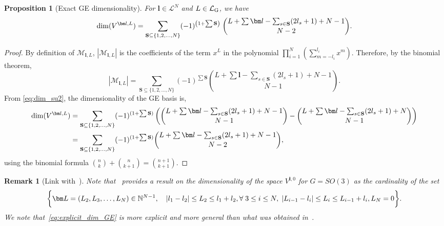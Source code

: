 \documentclass{article}
\newcommand{\card}[1]{|{#1}|}
\newcommand{\dimge}[2]{\dim(V^{#1,#2})}
\newtheorem{proposition}[theorem]{Proposition}
\newtheorem{remark}[theorem]{Remark}
\numberwithin{equation}{section}
\def\N{\mathbb{N}}
\def\bl{{\bm l}}
\def\bL{{\bm L}}
\def\calM{\mathcal{M}}
\def\calL{\mathcal{L}}
\def\calLG{\mathcal{\calL_{\rm G}}}
\def\dim{{{\rm dim}}}
\begin{document}
\begin{proposition}[Exact GE dimensionality]
    For $\bl\in\calL^N$ and $L\in\calLG$, we have
    \begin{equation}\label{eq:explicit_dim_GE}
        \dimge{\bl}{L}=\sum_{{\mathbf S}\subseteq \{1,2,\ldots,N\}}
        (-1)^{\left( 1+\sum {\mathbf S} \right)} 
        \;\binom{L+\sum\bl-\sum_{s\in{\mathbf S}}(2l_s+1)+N-1 }{N-2}.
    \end{equation}
\end{proposition}
\begin{proof} By definition of $\calM_{\bl,L}$, $\card{\calM_{\bl,L}}$ is the coefficients of the term $x^L$ in the polynomial
$
    \prod_{i=1}^N \left(\sum_{m=-l_i}^{l_i} x^m \right).
$
Therefore, by the binomial theorem,
\begin{equation*}
    \card{\calM_{\bl,L}}=\sum_{{\mathbf S}\subseteq \{1,2,\ldots,N\}}(-1)^{\sum {\mathbf S}} \binom{L+\sum\bl-\sum_{s\in{\mathbf S}}(2l_s+1)+N-1}{ N-1}.
\end{equation*}
From \eqref{eq:dim_su2}, the dimensionality of the GE basis is,
\begin{align*}
    \dimge{\bl}{L}&=\sum_{{\mathbf S}\subseteq \{1,2,\ldots,N\}}(-1)^{(1+\sum {\mathbf S})} \left(\binom{L+\sum\bl-\sum_{s\in{\mathbf S}}(2l_s+1)+N-1 }{ N-1}-\binom{L+\sum\bl-\sum_{s\in{\mathbf S}}(2l_s+1)+N }{ N-1}\right)\\
    &=\sum_{{\mathbf S}\subseteq \{1,2,\ldots,N\}}(-1)^{(1+\sum {\mathbf S})} \binom{L+\sum\bl-\sum_{s\in{\mathbf S}}(2l_s+1)+N-1 }{ N-2},
\end{align*}
using the binomial formula $\binom{n}{k}+\binom{n}{k+1}=\binom{n+1}{k+1}$.
\end{proof}


\begin{remark}[Link with~\cite{Dusson2022-ie}]
\label{rem:ace}
Note that~\cite[Proposition 5]{Dusson2022-ie}
provides a result on the dimensionality of the space $V^{\bl,0}$ for $G=SO(3)$ as the cardinality of the set
\[
\bigg\{ \bL = (L_2,L_3,\ldots,L_N)\in \N^{N-1}, 
      \quad 
      |l_1-l_2| \le L_2 \le l_1+l_2, \\
       \forall \; 3\le i\le N, \;
      |L_{i-1}-l_i| \le L_i \le {L_{i-1}+l_i}, L_N =0
      \bigg\}.
\]
We note that~\eqref{eq:explicit_dim_GE} is more explicit and more general than what was obtained in~\cite{Dusson2022-ie}.
\end{remark}
\end{document}

